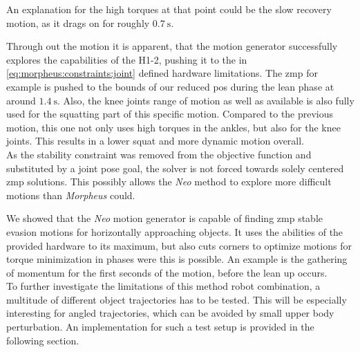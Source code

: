 An explanation for the high torques at that point could be the slow recovery motion, as it drags on for roughly $\SI{0.7}{\s}$.
\par
Through out the motion it is apparent, that the motion generator successfully explores the capabilities of the H1-2, pushing it to the in \cref{eq:morpheus:constraints:joint} defined hardware limitations.
The \acrshort{zmp} for example is pushed to the bounds of our reduced \acrshort{pos} during the lean phase at around $\SI{1.4}{\s}$.
Also, the knee joints range of motion as well as available is also fully used for the squatting part of this specific motion.
Compared to the previous motion, this one not only uses high torques in the ankles, but also for the knee joints.
This results in a lower squat and more dynamic motion overall.
\\
As the stability constraint was removed from the objective function and substituted by a joint pose goal, the solver is not forced towards solely centered \acrshort{zmp} solutions.
This possibly allows the \textit{Neo} method to explore more difficult motions than \textit{Morpheus} could.
\par
We showed that the \textit{Neo} motion generator is capable of finding \acrshort{zmp} stable evasion motions for horizontally approaching objects.
It uses the abilities of the provided hardware to its maximum, but also cuts corners to optimize motions for torque minimization in phases were this is possible.
An example is the gathering of momentum for the first seconds of the motion, before the lean up occurs.
\\
To further investigate the limitations of this method robot combination, a multitude of different object trajectories has to be tested.
This will be especially interesting for angled trajectories, which can be avoided by small upper body perturbation.
An implementation for such a test setup is provided in the following section.

